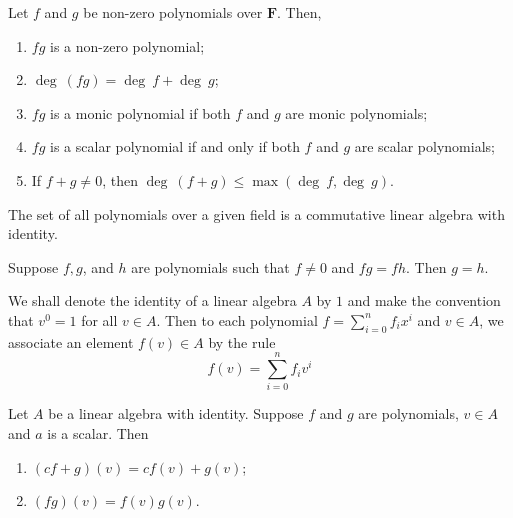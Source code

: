 \begin{theorem}
	Let $f$ and $g$ be non-zero polynomials over $\textbf{F}$. Then,
	\begin{enumerate}
		\item $fg$ is a non-zero polynomial;
		\item $\deg ~(fg) = \deg ~f + \deg ~g$;
		\item $fg$ is a monic polynomial if both $f$ and $g$ are monic polynomials;
		\item $fg$ is a scalar polynomial if and only if both $f$ and $g$ are scalar polynomials;
		\item If $f + g \neq 0$, then $\deg ~(f+g) \leq \max (\deg ~f, \deg ~g)$.
	\end{enumerate}
\end{theorem}

\begin{corollary}
	The set of all polynomials over a given field is a commutative linear algebra with identity.
\end{corollary}

\begin{corollary}
	Suppose $f, g$, and $h$ are polynomials such that $f \neq 0$ and $fg = fh$. Then $g=h$.
\end{corollary}

\begin{definition}
	We shall denote the identity of a linear algebra $A$ by $1$ and make the convention that $v^0 = 1$ for all $v \in A$. Then to each polynomial $f = \sum_{i=0}^n f_i x^i$ and $v \in A$, we associate an element $f(v) \in A$ by the rule
	\[
		f(v) = \sum_{i=0}^n f_i v^i
	\]
\end{definition}

\begin{theorem}
	Let $A$ be a linear algebra with identity. Suppose $f$ and $g$ are polynomials, $v \in A$ and $a$ is a scalar. Then
	\begin{enumerate}
		\item $(cf+g)(v) = cf(v) + g(v)$;
		\item $(fg)(v) = f(v)g(v)$.
	\end{enumerate}
\end{theorem}